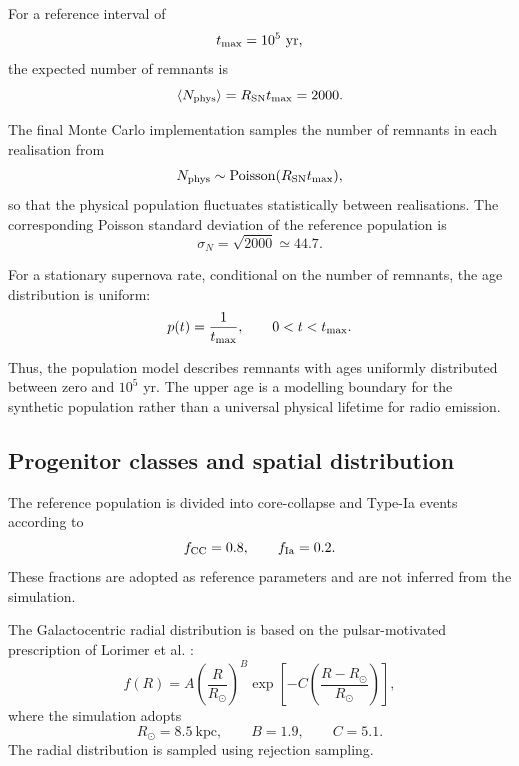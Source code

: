 \documentclass[
aps,
prd,
reprint,
superscriptaddress,
nofootinbib
]{revtex4-2}
\newcommand{\yr}{\mathrm{yr}}
\newcommand{\kpc}{\mathrm{kpc}}
\begin{document}
	For a reference interval of
	\begin{equation}
		t_{\rm max}=10^5~\yr,
	\end{equation}
	the expected number of remnants is
	\begin{equation}
		\langle N_{\rm phys}\rangle
		=
		R_{\rm SN}t_{\rm max}
		=
		2000.
		\label{eq:nphys}
	\end{equation}
	
	The final Monte Carlo implementation samples the number of remnants in each
	realisation from
	\begin{equation}
		N_{\rm phys}\sim
		{\rm Poisson}(R_{\rm SN}t_{\rm max}),
		\label{eq:poisson}
	\end{equation}
	so that the physical population fluctuates statistically between
	realisations.  The corresponding Poisson standard deviation of the reference
	population is
	\begin{equation}
		\sigma_N=\sqrt{2000}\simeq44.7.
	\end{equation}
	
	For a stationary supernova rate, conditional on the number of remnants, the
	age distribution is uniform:
	\begin{equation}
		p(t)=\frac{1}{t_{\rm max}},
		\qquad
		0<t<t_{\rm max}.
		\label{eq:age}
	\end{equation}
	
	Thus, the population model describes remnants with ages uniformly distributed
	between zero and $10^5$ yr.  The upper age is a modelling boundary for the
	synthetic population rather than a universal physical lifetime for radio
	emission.
	
	\subsection{Progenitor classes and spatial distribution}
	
	The reference population is divided into core-collapse and Type-Ia events
	according to
	\begin{equation}
		f_{\rm CC}=0.8,
		\qquad
		f_{\rm Ia}=0.2.
		\label{eq:typefrac}
	\end{equation}
	These fractions are adopted as reference parameters and are not inferred from
	the simulation.
	
	The Galactocentric radial distribution is based on the pulsar-motivated
	prescription of Lorimer et al. \cite{Lorimer2006}:
	\begin{equation}
		f(R)
		=
		A
		\left(\frac{R}{R_\odot}\right)^B
		\exp\left[
		-C\left(\frac{R-R_\odot}{R_\odot}\right)
		\right],
		\label{eq:lorimer}
	\end{equation}
	where the simulation adopts
	\begin{equation}
		R_\odot=8.5~\kpc,
		\qquad
		B=1.9,
		\qquad
		C=5.1.
	\end{equation}
	The radial distribution is sampled using rejection sampling.
	
\end{document}
